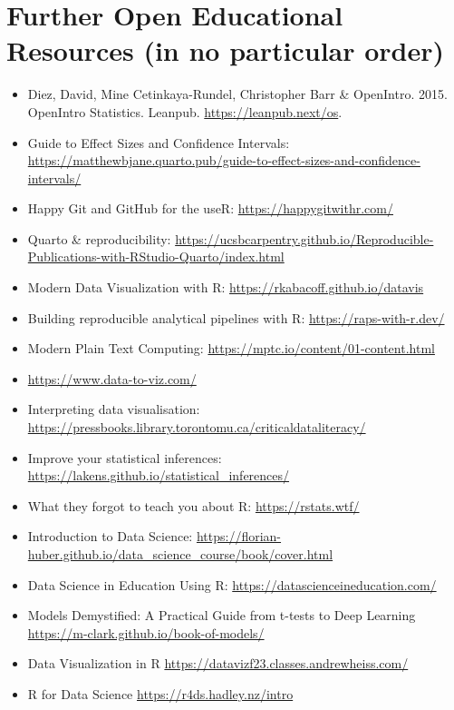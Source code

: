 \documentclass[
  letterpaper,
  DIV=11,
  numbers=noendperiod,
  oneside]{scrreprt}
\providecommand{\tightlist}{%
  \setlength{\itemsep}{0pt}\setlength{\parskip}{0pt}}\usepackage{longtable,booktabs,array}
\begin{document}
\section{Further Open Educational Resources (in no particular
order)}\label{further-open-educational-resources-in-no-particular-order}

\begin{itemize}
\tightlist
\item
  Diez, David, Mine Cetinkaya-Rundel, Christopher Barr \& OpenIntro.
  2015. OpenIntro Statistics. Leanpub. \url{https://leanpub.next/os}.
\item
  Guide to Effect Sizes and Confidence Intervals:
  \url{https://matthewbjane.quarto.pub/guide-to-effect-sizes-and-confidence-intervals/}
\item
  Happy Git and GitHub for the useR: \url{https://happygitwithr.com/}
\item
  Quarto \& reproducibility:
  \url{https://ucsbcarpentry.github.io/Reproducible-Publications-with-RStudio-Quarto/index.html}
\item
  Modern Data Visualization with R:
  \url{https://rkabacoff.github.io/datavis}
\item
  Building reproducible analytical pipelines with R:
  \url{https://raps-with-r.dev/}
\item
  Modern Plain Text Computing:
  \url{https://mptc.io/content/01-content.html}
\item
  \url{https://www.data-to-viz.com/}
\item
  Interpreting data visualisation:
  \url{https://pressbooks.library.torontomu.ca/criticaldataliteracy/}
\item
  Improve your statistical inferences:
  \url{https://lakens.github.io/statistical_inferences/}
\item
  What they forgot to teach you about R: \url{https://rstats.wtf/}
\item
  Introduction to Data Science:
  \url{https://florian-huber.github.io/data_science_course/book/cover.html}
\item
  Data Science in Education Using R:
  \url{https://datascienceineducation.com/}
\item
  Models Demystified: A Practical Guide from t-tests to Deep Learning
  \url{https://m-clark.github.io/book-of-models/}
\item
  Data Visualization in R
  \url{https://datavizf23.classes.andrewheiss.com/}
\item
  R for Data Science \url{https://r4ds.hadley.nz/intro}
\end{itemize}
\end{document}
